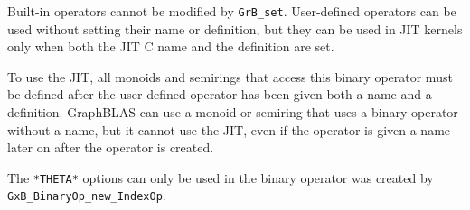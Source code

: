 Built-in operators cannot be modified by \verb'GrB_set'.  User-defined
operators can be used without setting their name or definition, but they can be
used in JIT kernels only when both the JIT C name and the definition are set.

To use the JIT, all monoids and semirings that access this binary operator must
be defined after the user-defined operator has been given both a name and a
definition.  GraphBLAS can use a monoid or semiring that uses a binary operator
without a name, but it cannot use the JIT, even if the operator is given a name
later on after the operator is created.

The \verb'*THETA*' options can only be used in the binary operator was
created by \verb'GxB_BinaryOp_new_IndexOp'.

